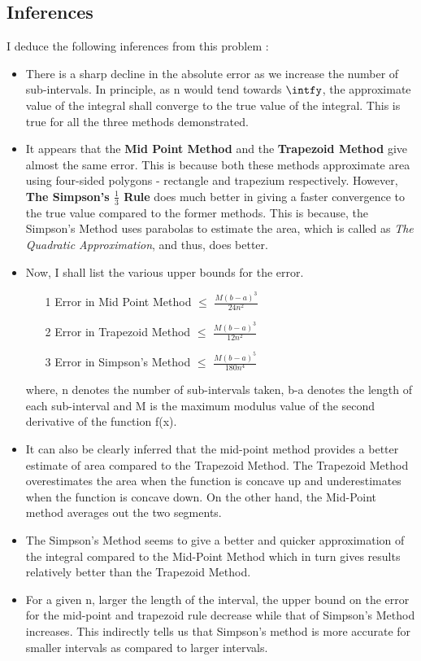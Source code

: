 \documentclass[titlepage, 11pt]{article}
\begin{document}
\subsection{Inferences}
I deduce the following inferences from this problem :
\begin{itemize}
    \item There is a sharp decline in the absolute error as we increase the number of sub-intervals. In principle, as n would tend towards $\intfy$, the approximate value of the integral shall converge to the true value of the integral. This is true for all the three methods demonstrated.  
    \item It appears that the \textbf{Mid Point Method} and the  \textbf{Trapezoid Method} give almost the same error. This is because both these methods approximate area using four-sided polygons - rectangle and trapezium respectively. However, \textbf{The Simpson's $\frac{1}{3}$ Rule} does much better in giving a faster convergence to the true value compared to the former methods. This is because, the Simpson's Method uses parabolas to estimate the area, which is called as \textit{The Quadratic Approximation}, and thus, does better. 
    \item Now, I shall list the various upper bounds for the error.
    \begin{itemize}
        \item [1] Error in Mid Point Method $\leq$ $\frac{M(b-a)^3}{24n^2}$
        \item [2] Error in Trapezoid Method $\leq$ $\frac{M(b-a)^3}{12n^2}$
        \item [3] Error in Simpson's Method $\leq$ $\frac{M(b-a)^5}{180n^4}$
    \end{itemize}
    where, n denotes the number of sub-intervals taken, b-a denotes the length of each sub-interval and M is the maximum modulus value of the second derivative of the function f(x).
    \item It can also be clearly inferred that the mid-point method provides a better estimate of area compared to the Trapezoid Method. The Trapezoid Method overestimates the area when the function is concave up and underestimates when the function is concave down. On the other hand, the Mid-Point method averages out the two segments. 
    \item The Simpson's Method seems to give a better and quicker approximation of the integral compared to the Mid-Point Method which in turn gives results relatively better than the Trapezoid Method.
    \item For a given n, larger the length of the interval, the upper bound on the error for the mid-point and trapezoid rule decrease while that of Simpson's Method increases. This indirectly tells us that Simpson's method is more accurate for smaller intervals as compared to larger intervals. 

\end{itemize}
\end{document}
